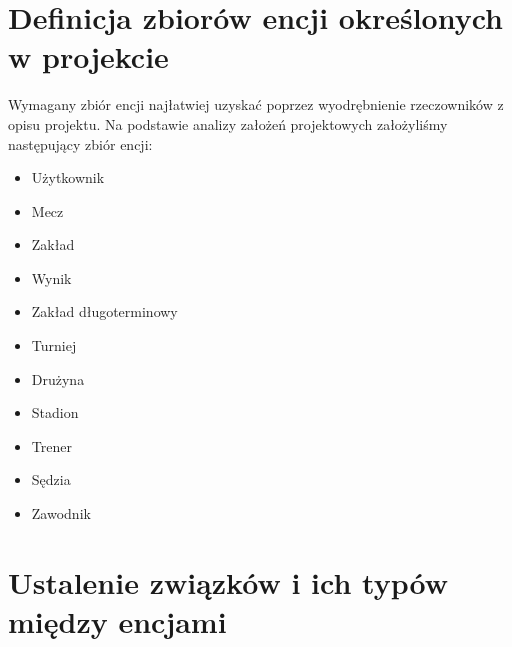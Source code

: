 \documentclass{mwrep}[15pt]
\begin{document}
\section{Definicja zbiorów encji określonych w projekcie}
Wymagany zbiór encji najłatwiej uzyskać poprzez wyodrębnienie rzeczowników z opisu projektu.
Na podstawie analizy założeń projektowych założyliśmy następujący zbiór encji:

\begin{itemize}
	\item Użytkownik
	\item Mecz
	\item Zakład
	\item Wynik
	\item Zakład długoterminowy
	\item Turniej
	\item Drużyna
	\item Stadion
	\item Trener
	\item Sędzia
	\item Zawodnik
\end{itemize}
 
\vspace{1cm}
\section{Ustalenie związków i ich typów między encjami}
\end{document}
